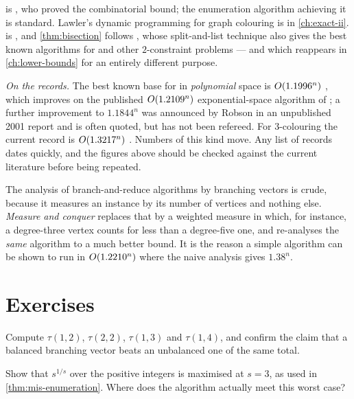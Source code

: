  is \citet{MoonMoser1965}, who proved the combinatorial
bound; the enumeration algorithm achieving it is standard. Lawler's dynamic
programming for graph colouring \citep{Lawler1976} is in
\cref{ch:exact-ii}.  is
\citet{SchroeppelShamir1981}, and \cref{thm:bisection} follows
\citet{Williams2005}, whose split-and-list technique also gives the best known
algorithms for  and other $2$-constraint problems --- and which
reappears in \cref{ch:lower-bounds} for an entirely different purpose.

\emph{On the records.} The best known base for 
in \emph{polynomial} space is $O\!\left(1.1996^n\right)$
\citep{XiaoNagamochi2017}, which improves on the published
$O\!\left(1.2109^n\right)$ exponential-space algorithm of \citet{Robson1986}; a further
improvement to $1.1844^n$ was announced by Robson in an unpublished 2001
report and is often quoted, but has not been refereed. For $3$-colouring the
current record is $O\!\left(1.3217^n\right)$ \citep{Meijer2023}. Numbers of this kind
move. Any list of records dates quickly, and the figures above should be
checked against the current literature before being repeated.

The analysis of branch-and-reduce algorithms by branching vectors is crude,
because it measures an instance by its number of vertices and nothing else.
\emph{Measure and conquer} \citep{FominGrandoniKratsch2009} replaces that by a
weighted measure in which, for instance, a degree-three vertex counts for less
than a degree-five one, and re-analyses the \emph{same} algorithm to a much
better bound. It is the reason a simple algorithm can be shown to run in
$O\!\left(1.2210^n\right)$ where the naive analysis gives $1.38^n$.

\section{Exercises}
\label{sec:ex-exact-i}

\begin{exercise}
Compute $\tau(1,2)$, $\tau(2,2)$, $\tau(1,3)$ and $\tau(1,4)$, and confirm the
claim that a balanced branching vector beats an unbalanced one of the same
total.
\end{exercise}

\begin{exercise}
Show that $s^{1/s}$ over the positive integers is maximised at $s = 3$, as used
in \cref{thm:mis-enumeration}. Where does the algorithm actually meet this
worst case?
\end{exercise}


